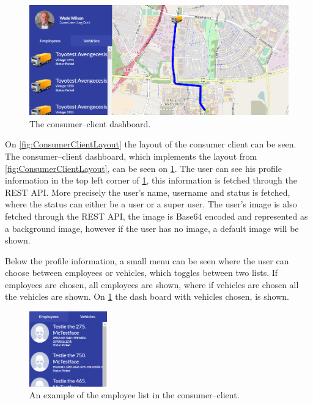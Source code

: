 \begin{figure}[h]
    \centering
    \includegraphics[scale=0.35]{img/ConsumerClientExample.png}
    \caption{The consumer--client dashboard.}
    \label{fig:ConsumerClientExample}
\end{figure}

On \cref{fig:ConsumerClientLayout} the layout of the consumer client can be seen.
The consumer--client dashboard, which implements the layout from \cref{fig:ConsumerClientLayout}, can be seen on \cref{fig:ConsumerClientExample}.
The user can see his profile information in the top left corner of \cref{fig:ConsumerClientExample}, this information is fetched through the REST API.
More precisely the user's name, username and status is fetched, where the status can either be a user or a super user.
The user's image is also fetched through the REST API, the image is Base64 encoded and represented as a background image, however if the user has no image, a default image will be shown.

Below the profile information, a small menu can be seen where the user can choose between employees or vehicles, which toggles between two lists.
If employees are chosen, all employees are shown, where if vehicles are chosen all the vehicles are shown.
On \cref{fig:ConsumerClientExample} the dash board with vehicles chosen, is shown.

\begin{figure}[h]
    \centering
    \includegraphics[width=0.3\textwidth]{img/displayOfMenuesInConsumerClient.png}
    \caption{An example of the employee list in the consumer--client.}
    \label{fig:ConsumerClientMenus}
\end{figure}

